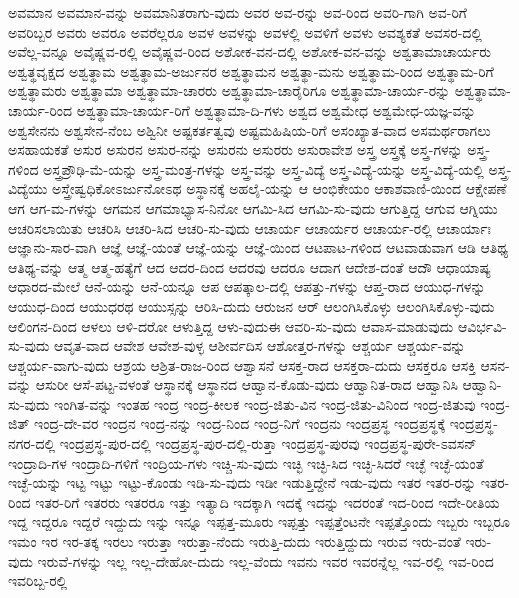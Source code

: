 ಅವಮಾನ
ಅವಮಾನ-ವನ್ನು
ಅವಮಾನಿತರಾಗು-ವುದು
ಅವರ
ಅವ-ರನ್ನು
ಅವ-ರಿಂದ
ಅವರಿ-ಗಾಗಿ
ಅವ-ರಿಗೆ
ಅವರಿಬ್ಬರ
ಅವರು
ಅವರೂ
ಅವರೆಲ್ಲರೂ
ಅವಳ
ಅವಳನ್ನು
ಅವಳಲ್ಲಿ
ಅವಳಿಗೆ
ಅವಳು
ಅವಶ್ಯಕತೆ
ಅವಸರ-ದಲ್ಲಿ
ಅವೆಲ್ಲ-ವನ್ನೂ
ಅವೈಷ್ಣವ-ರಲ್ಲಿ
ಅವೈಷ್ಣವ-ರಿಂದ
ಅಶೋಕ-ವನ-ದಲ್ಲಿ
ಅಶೋಕ-ವನ-ವನ್ನು
ಅಶ್ವತಾಮಾಚಾರ್ಯರು
ಅಶ್ವತ್ಥವೃಕ್ಷದ
ಅಶ್ವತ್ಥಾಮ
ಅಶ್ವತ್ಥಾಮ-ಅರ್ಜುನರ
ಅಶ್ವತ್ಥಾಮನ
ಅಶ್ವತ್ಥಾ-ಮನು
ಅಶ್ವತ್ಥಾಮ-ರಿಂದ
ಅಶ್ವತ್ಥಾಮ-ರಿಗೆ
ಅಶ್ವತ್ಥಾಮರು
ಅಶ್ವತ್ಥಾಮಾ
ಅಶ್ವತ್ಥಾಮಾ-ಚಾರರು
ಅಶ್ವತ್ಥಾಮಾ-ಚಾರೈರಿಗೂ
ಅಶ್ವತ್ಥಾಮಾ-ಚಾರ್ಯ-ರನ್ನು
ಅಶ್ವತ್ಥಾಮಾ-ಚಾರ್ಯ-ರಿಂದ
ಅಶ್ವತ್ಥಾಮಾ-ಚಾರ್ಯ-ರಿಗೆ
ಅಶ್ವತ್ಥಾಮಾ-ದಿ-ಗಳು
ಅಶ್ವದ
ಅಶ್ವಮೇಧ
ಅಶ್ವಮೇಧ-ಯಜ್ಞ-ವನ್ನು
ಅಶ್ವಸೇನನು
ಅಶ್ವಸೇನ-ನೆಂಬ
ಅಶ್ವಿನೀ
ಅಷ್ಟಕರ್ತತ್ವವು
ಅಷ್ಟಮಹಿಷಿಯ-ರಿಗೆ
ಅಸಂಖ್ಯಾತ-ವಾದ
ಅಸಮರ್ಥರಾಗಲು
ಅಸಹಾಯಕತೆ
ಅಸುರ
ಅಸುರನ
ಅಸುರ-ನನ್ನು
ಅಸುರನು
ಅಸುರರು
ಅಸುರಾವೇಶ
ಅಸ್ತ್ರ
ಅಸ್ತ್ರಕ್ಕೆ
ಅಸ್ತ್ರ-ಗಳನ್ನು
ಅಸ್ತ್ರ-ಗಳಿಂದ
ಅಸ್ತ್ರಪ್ರೌಢಿ-ಮೆ-ಯನ್ನು
ಅಸ್ತ್ರ-ಮಂತ್ರ-ಗಳನ್ನು
ಅಸ್ತ್ರ-ವನ್ನು
ಅಸ್ತ್ರ-ವಿದ್ಯೆ
ಅಸ್ತ್ರ-ವಿದ್ಯೆ-ಯನ್ನು
ಅಸ್ತ್ರ-ವಿದ್ಯೆ-ಯಲ್ಲಿ
ಅಸ್ತ್ರ-ವಿದ್ಯೆಯು
ಅಸ್ತ್ರೇಷ್ವಧಿಕೋಽರ್ಜುನೋಽಥ
ಅಸ್ಥಾನಕ್ಕೆ
ಅಹಲೈ-ಯನ್ನು
ಆ
ಆಂಭಿಕೇಯಂ
ಆಕಾಶವಾಣಿ-ಯಿಂದ
ಆಕ್ಷೇಪಣೆ
ಆಗ
ಆಗ-ಮ-ಗಳನ್ನು
ಆಗಮನ
ಆಗಮಾಭ್ಯಾಸ-ನಿನೋ
ಆಗಮಿ-ಸಿದ
ಆಗಮಿ-ಸು-ವುದು
ಆಗುತ್ತಿದ್ದ
ಆಗುವ
ಆಗ್ನಿಯು
ಆಚರಿಸಲಾಯಿತು
ಆಚರಿಸಿ
ಆಚರಿ-ಸಿದ
ಆಚರಿ-ಸು-ವುದು
ಆಚಾರ್ಯ
ಆಚಾರ್ಯರ
ಆಚಾರ್ಯ-ರಲ್ಲಿ
ಆಚಾರ್ಯಾಃ
ಆಜ್ಞಾನು-ಸಾರ-ವಾಗಿ
ಆಜ್ಞೆ
ಆಜ್ಞೆ-ಯಂತೆ
ಆಜ್ಞೆ-ಯನ್ನು
ಆಜ್ಞೆ-ಯಿಂದ
ಆಟಪಾಟ-ಗಳಿಂದ
ಆಟವಾಡುವಾಗ
ಆಡಿ
ಆತಿಥ್ಯ
ಆತಿಥ್ಯ-ವನ್ನು
ಆತ್ಮ
ಆತ್ಮ-ಹತ್ಯೆಗೆ
ಆದ
ಆದರ-ದಿಂದ
ಆದರವು
ಆದರೂ
ಆದಾಗ
ಆದೇಶ-ದಂತೆ
ಆದೌ
ಆಧಾಯಾಷ್ಯ
ಆಧಾರದ-ಮೇಲೆ
ಆನೆ-ಯನ್ನು
ಆನೆ-ಯನ್ನೂ
ಆಪ
ಆಪತ್ಕಾಲ-ದಲ್ಲಿ
ಆಪತ್ತು-ಗಳನ್ನು
ಆಪ್ತ-ರಾದ
ಆಯುಧ-ಗಳನ್ನು
ಆಯುಧ-ದಿಂದ
ಆಯುಧರಥ
ಆಯುಸ್ಸನ್ನು
ಆರಿಸಿ-ದುದು
ಆರುಜನ
ಆರ್
ಆಲಂಗಿಸಿಕೊಳ್ಳು
ಆಲಂಗಿಸಿಕೊಳ್ಳು-ವುದು
ಆಲಿಂಗನ-ದಿಂದ
ಆಳಲು
ಆಳಿ-ದರೋ
ಆಳುತ್ತಿದ್ದ
ಆಳು-ವುದುಈ
ಆವರಿ-ಸು-ವುದು
ಆವಾಸ-ಮಾಡುವುದು
ಆವಿರ್ಭವಿ-ಸು-ವುದು
ಆವೃತ-ವಾದ
ಆವೇಶ
ಆವೇಶ-ವುಳ್ಳ
ಆಶೀರ್ವದಿಸ
ಆಶೋತ್ತರ-ಗಳನ್ನು
ಆಶ್ಚರ್ಯ
ಆಶ್ಚರ್ಯ-ವನ್ನು
ಆಶ್ಚರ್ಯ-ವಾಗು-ವುದು
ಆಶ್ರಯ
ಆಶ್ರಿತ-ರಾಜ-ರಿಂದ
ಆಶ್ವಾಸನೆ
ಆಸಕ್ತ-ರಾದ
ಆಸಕ್ತರಾ-ದುದು
ಆಸಕ್ತರೂ
ಆಸಕ್ತಿ
ಆಸನ-ವನ್ನು
ಆಸುರೀ
ಆಸೆ-ಪಟ್ಟ-ವಳಂತೆ
ಆಸ್ಥಾನಕ್ಕೆ
ಆಸ್ಥಾನದ
ಆಹ್ವಾನ-ಕೊಡು-ವುದು
ಆಹ್ವಾನಿತ-ರಾದ
ಆಹ್ವಾನಿಸಿ
ಆಹ್ವಾನಿ-ಸು-ವುದು
ಇಂಗಿತ-ವನ್ನು
ಇಂತಹ
ಇಂದ್ರ
ಇಂದ್ರ-ಕೀಲಕ
ಇಂದ್ರ-ಜಿತು-ವಿನ
ಇಂದ್ರ-ಜಿತು-ವಿನಿಂದ
ಇಂದ್ರ-ಜಿತುವು
ಇಂದ್ರ-ಜಿತ್
ಇಂದ್ರ-ದೇ-ವರ
ಇಂದ್ರನ
ಇಂದ್ರ-ನನ್ನು
ಇಂದ್ರ-ನಿಂದ
ಇಂದ್ರ-ನಿಗೆ
ಇಂದ್ರನು
ಇಂದ್ರಪ್ರಸ್ಥ
ಇಂದ್ರಪ್ರಸ್ಥಕ್ಕೆ
ಇಂದ್ರಪ್ರಸ್ಥ-ನಗರ-ದಲ್ಲಿ
ಇಂದ್ರಪ್ರಸ್ಥ-ಪುರ-ದಲ್ಲಿ
ಇಂದ್ರಪ್ರಸ್ಥ-ಪುರ-ದಲ್ಲಿ-ರುತ್ತಾ
ಇಂದ್ರಪ್ರಸ್ಥ-ಪುರವು
ಇಂದ್ರಪ್ರಸ್ಥ-ಪುರೇ-ಽವಸನ್
ಇಂದ್ರಾದಿ-ಗಳ
ಇಂದ್ರಾದಿ-ಗಳಿಗೆ
ಇಂದ್ರಿಯ-ಗಳು
ಇಚ್ಚಿ-ಸು-ವುದು
ಇಚ್ಛಿ
ಇಚ್ಛಿ-ಸಿದ
ಇಚ್ಛಿ-ಸಿದರೆ
ಇಚ್ಛೆ
ಇಚ್ಛೆ-ಯಂತೆ
ಇಚ್ಛೆ-ಯನ್ನು
ಇಟ್ಟ
ಇಟ್ಟು
ಇಟ್ಟು-ಕೊಂಡು
ಇಡಿ-ಸು-ವುದು
ಇಡೀ
ಇಡುತ್ತಿದ್ದೇನೆ
ಇಡು-ವುದು
ಇತರ
ಇತರ-ರನ್ನು
ಇತರ-ರಿಂದ
ಇತರ-ರಿಗೆ
ಇತರರು
ಇತರರೂ
ಇತ್ತು
ಇತ್ಯಾದಿ
ಇದಕ್ಕಾಗಿ
ಇದಕ್ಕೆ
ಇದನ್ನು
ಇದರಂತೆ
ಇದ-ರಿಂದ
ಇದೇ-ರೀತಿಯ
ಇದ್ದ
ಇದ್ದರೂ
ಇದ್ದರೆ
ಇದ್ದುದು
ಇನ್ನು
ಇನ್ನೂ
ಇಪ್ಪತ್ತ-ಮೂರು
ಇಪ್ಪತ್ತು
ಇಪ್ಪತ್ತೆಂಟನೇ
ಇಪ್ಪತ್ತೊಂದು
ಇಬ್ಬರು
ಇಬ್ಬರೂ
ಇಮಂ
ಇರ
ಇರ-ತಕ್ಕ
ಇರಲು
ಇರುತ್ತಾ
ಇರುತ್ತಾ-ನೆಂದು
ಇರುತ್ತಿ-ದುದು
ಇರುತ್ತಿದ್ದುದು
ಇರುವ
ಇರು-ವಂತೆ
ಇರು-ವುದು
ಇರುವೆ-ಗಳನ್ನು
ಇಲ್ಲ
ಇಲ್ಲ-ದೇಹೋ-ದುದು
ಇಲ್ಲ-ವೆಂದು
ಇವನು
ಇವರ
ಇವರನ್ನೆಲ್ಲ
ಇವ-ರಲ್ಲಿ
ಇವ-ರಿಂದ
ಇವರಿಬ್ಬ-ರಲ್ಲಿ
